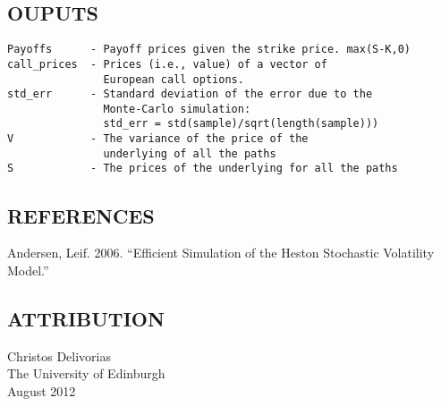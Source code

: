 \subsection*{OUPUTS}

\begin{verbatim}
Payoffs      - Payoff prices given the strike price. max(S-K,0)
call_prices  - Prices (i.e., value) of a vector of 
               European call options.
std_err      - Standard deviation of the error due to the 
               Monte-Carlo simulation: 
               std_err = std(sample)/sqrt(length(sample)))
V            - The variance of the price of the 
               underlying of all the paths
S            - The prices of the underlying for all the paths\end{verbatim}


\subsection*{REFERENCES}

\begin{par}
[AN06] Andersen, Leif. 2006. “Efficient Simulation of the Heston Stochastic Volatility Model.”
\end{par} \vspace{1em}


\subsection*{ATTRIBUTION}

\begin{par}
Christos  Delivorias \\ The University of Edinburgh \\August 2012
\end{par} \vspace{1em}

    
